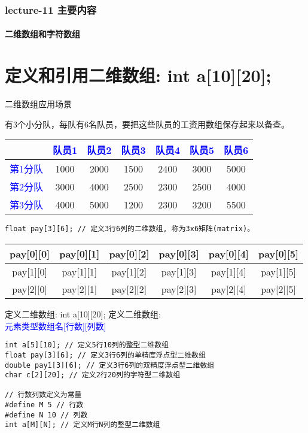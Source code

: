 \begin{frame}[shrink]
  \frametitle{lecture-11 主要内容}
  \framesubtitle{二维数组和字符数组}
  \tableofcontents[hideallsubsections]
\end{frame}



\section{定义和引用二维数组: int a[10][20];}

\begin{frame}{二维数组应用场景}
\begin{example}
	有3个小分队，每队有6名队员，要把这些队员的工资用数组保存起来以备查。
	\begin{tabular}{|c|c|c|c|c|c|c|}
		\hline 
	     & \textcolor{blue}{队员1} & \textcolor{blue}{队员2} & \textcolor{blue}{队员3} & \textcolor{blue}{队员4} & \textcolor{blue}{队员5} & \textcolor{blue}{队员6}\\
	    \hline  
	    \textcolor{blue}{第1分队}& 1000 & 2000 & 1500 & 2400 & 3000 & 5000\\ 
		\hline 
		\textcolor{blue}{第2分队}& 3000 & 4000 & 2500 & 2300 & 2500 & 4000\\ 
		\hline 
		\textcolor{blue}{第3分队}& 4000 & 5000 & 1200 & 2300 & 3200 & 5500\\ 
		\hline 
	\end{tabular} 
\end{example}
\begin{lstlisting}
float pay[3][6]; // 定义3行6列的二维数组, 称为3x6矩阵(matrix)。
\end{lstlisting}
\begin{tabular}{|c|c|c|c|c|c|}
	\hline  
	pay[0][0] & pay[0][1] & pay[0][2] & pay[0][3] & pay[0][4] & pay[0][5] \\ 
	\hline 
	pay[1][0] & pay[1][1] & pay[1][2] & pay[1][3] & pay[1][4] & pay[1][5] \\ 
	\hline 
	pay[2][0] & pay[2][1] & pay[2][2] & pay[2][3] & pay[2][4] & pay[2][5] \\ 
	\hline 
\end{tabular} 
\end{frame}

\begin{frame}{定义二维数组: int a[10][20];}
定义二维数组: \\
\textcolor{blue}{元素类型\quad 数组名[行数][列数]}
\begin{lstlisting}
int a[5][10]; // 定义5行10列的整型二维数组
float pay[3][6]; // 定义3行6列的单精度浮点型二维数组
double pay1[3][6]; // 定义3行6列的双精度浮点型二维数组
char c[2][20]; // 定义2行20列的字符型二维数组

// 行数列数定义为常量
#define M 5 // 行数
#define N 10 // 列数
int a[M][N]; // 定义M行N列的整型二维数组
\end{lstlisting}
\end{frame}

